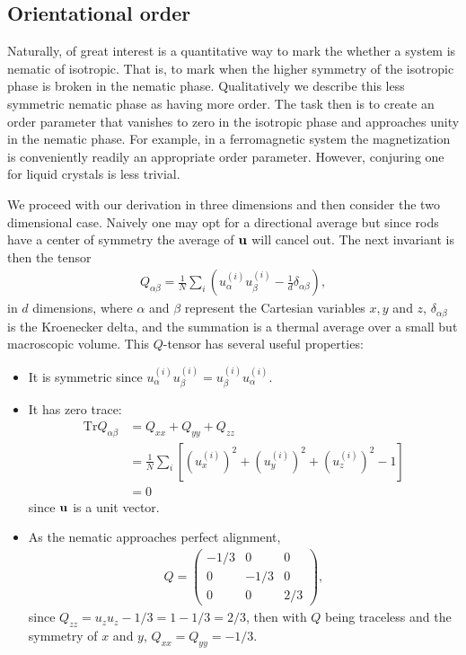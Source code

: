 \subsection{Orientational order}
\label{Order param}
Naturally, of great interest is a quantitative way to mark the whether a system is nematic of isotropic. That is, to mark when the higher symmetry of the isotropic phase is broken in the nematic phase. Qualitatively we describe this less symmetric nematic phase as having more order. The task then is to create an order parameter that vanishes to zero in the isotropic phase and approaches unity in the nematic phase.
For example, in a ferromagnetic system the magnetization is conveniently readily an appropriate order parameter. However, conjuring one for liquid crystals is less trivial.

We proceed with our derivation in three dimensions and then consider the two dimensional case. Naively one may opt for a directional average but since rods have a center of symmetry the average of $\mathbf{u}$ will cancel out. The next invariant is then the tensor
\begin{align}
	Q_{\alpha\beta} 
	= \frac{1}{N}\sum_i\left(u_\alpha^{(i)}u_\beta^{(i)} - \frac{1}{d}\delta_{\alpha\beta} \right),
\end{align}
in $d$ dimensions, where $\alpha$ and $\beta$ represent the Cartesian variables $x,y$ and $z$, $\delta_{\alpha\beta}$ is the Kroenecker delta, and the summation is a thermal average over a small but macroscopic volume. This $Q$-tensor has several useful properties:
\begin{itemize}
	\item It is symmetric since $u_\alpha^{(i)}u_\beta^{(i)} = 
	u_\beta^{(i)}u_\alpha^{(i)}$.\\
	
	\item It has zero trace:
	\begin{align*}
		\text{Tr}Q_{\alpha\beta} &= Q_{xx}+Q_{yy}+Q_{zz}\\
		&= \frac{1}{N}\sum_i\left[(u_x^{(i)})^2
		+ (u_y^{(i)})^2 + (u_z^{(i)})^2 - 1\right] \\
		&= 0
	\end{align*}
	since $\mathbf{u}$ is a unit vector.\\
	
	\item As the nematic approaches perfect alignment,
	\begin{align*}
		Q = \left(
		\begin{matrix}
		-1/3 & 0 & 0\\
		0 & -1/3 & 0\\
		0 & 0 & 2/3
		\end{matrix}
		\right),
	\end{align*}
	since $Q_{zz} = u_zu_z - 1/3 = 1 - 1/3 = 2/3$, then with $Q$ being traceless and the symmetry of $x$ and $y$, $Q_{xx}=Q_{yy}=-1/3$.\\
\end{itemize} 

